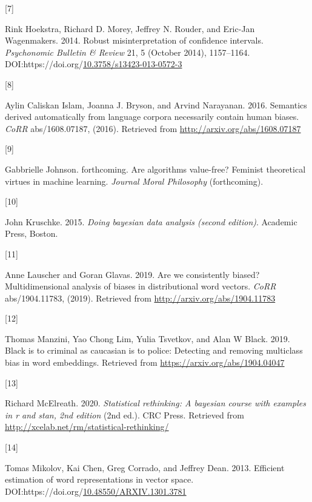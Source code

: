 \documentclass[
  12pt,
  dvipsnames,enabledeprecatedfontcommands]{scrartcl}
\newlength{\cslhangindent}
\newlength{\csllabelwidth}
\newlength{\cslentryspacingunit} %
\newenvironment{CSLReferences}[2] %
 {%
  \setlength{\parindent}{0pt}
  \ifodd #1
  \let\oldpar\par
  \def\par{\hangindent=\cslhangindent\oldpar}
  \fi
  \setlength{\parskip}{#2\cslentryspacingunit}
 }%
 {}
\newcommand{\CSLLeftMargin}[1]{\parbox[t]{\csllabelwidth}{#1}}
\newcommand{\CSLRightInline}[1]{\parbox[t]{\linewidth - \csllabelwidth}{#1}\break}
\begin{document}
\begin{CSLReferences}{0}{0}
\leavevmode{}%
\CSLLeftMargin{{[}7{]} }%
\CSLRightInline{Rink Hoekstra, Richard D. Morey, Jeffrey N. Rouder, and
Eric-Jan Wagenmakers. 2014. Robust misinterpretation of confidence
intervals. \emph{Psychonomic Bulletin \& Review} 21, 5 (October 2014),
1157--1164.
DOI:https://doi.org/\href{https://doi.org/10.3758/s13423-013-0572-3}{10.3758/s13423-013-0572-3}}

\leavevmode{}%
\CSLLeftMargin{{[}8{]} }%
\CSLRightInline{Aylin Caliskan Islam, Joanna J. Bryson, and Arvind
Narayanan. 2016. Semantics derived automatically from language corpora
necessarily contain human biases. \emph{CoRR} abs/1608.07187, (2016).
Retrieved from \url{http://arxiv.org/abs/1608.07187}}

\leavevmode{}%
\CSLLeftMargin{{[}9{]} }%
\CSLRightInline{Gabbrielle Johnson. forthcoming. Are algorithms
value-free? Feminist theoretical virtues in machine learning.
\emph{Journal Moral Philosophy} (forthcoming).}

\leavevmode{}%
\CSLLeftMargin{{[}10{]} }%
\CSLRightInline{John Kruschke. 2015. \emph{Doing bayesian data analysis
(second edition)}. Academic Press, Boston.}

\leavevmode{}%
\CSLLeftMargin{{[}11{]} }%
\CSLRightInline{Anne Lauscher and Goran Glavas. 2019. Are we
consistently biased? Multidimensional analysis of biases in
distributional word vectors. \emph{CoRR} abs/1904.11783, (2019).
Retrieved from \url{http://arxiv.org/abs/1904.11783}}

\leavevmode{}%
\CSLLeftMargin{{[}12{]} }%
\CSLRightInline{Thomas Manzini, Yao Chong Lim, Yulia Tsvetkov, and Alan
W Black. 2019. Black is to criminal as caucasian is to police: Detecting
and removing multiclass bias in word embeddings. Retrieved from
\url{https://arxiv.org/abs/1904.04047}}

\leavevmode{}%
\CSLLeftMargin{{[}13{]} }%
\CSLRightInline{Richard McElreath. 2020. \emph{Statistical rethinking: A
bayesian course with examples in r and stan, 2nd edition} (2nd ed.). CRC
Press. Retrieved from
\url{http://xcelab.net/rm/statistical-rethinking/}}

\leavevmode{}%
\CSLLeftMargin{{[}14{]} }%
\CSLRightInline{Tomas Mikolov, Kai Chen, Greg Corrado, and Jeffrey Dean.
2013. Efficient estimation of word representations in vector space.
DOI:https://doi.org/\href{https://doi.org/10.48550/ARXIV.1301.3781}{10.48550/ARXIV.1301.3781}}


\end{CSLReferences}
\end{document}
